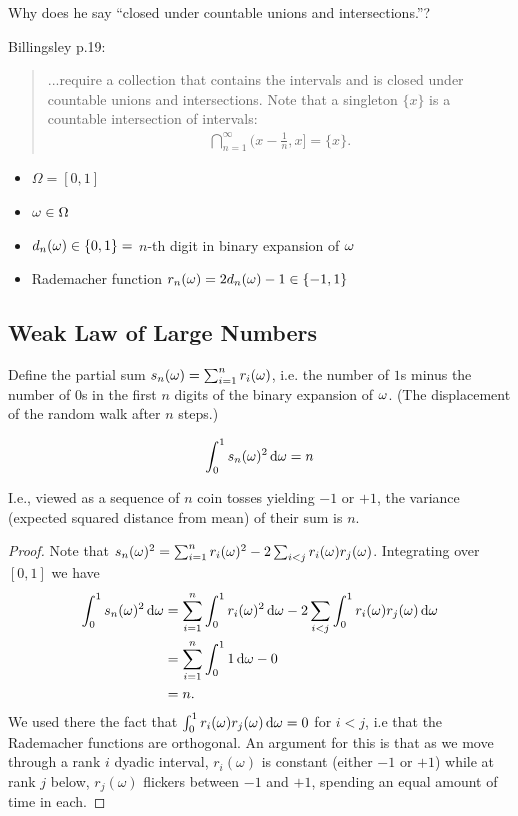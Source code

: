 Why does he say ``closed under countable unions and intersections.​''?

  Billingsley p.19:
  \begin{quote}
    ...require a collection that contains the intervals and is closed under countable unions and intersections.
    Note that a singleton $\{x\}$ is a countable intersection of intervals:
    \begin{align*}
      \bigcap_{n=1}^\infty \Big(x -\frac{1}{n}, x\Big] = \{x\}.
    \end{align*}
  \end{quote}


\begin{itemize}
\item $\Omega = [0, 1]$
\item $\omega \in \Omega$
\item $d_n(\omega) \in \{0, 1\} = $ $n$-th digit in binary expansion of $\omega$
\item Rademacher function $r_n(\omega) = 2d_n(\omega) - 1 \in \{-1, 1\}$
\end{itemize}

\subsection{Weak Law of Large Numbers}

Define the partial sum $s_n(\omega) = \sum_{i=1}^n r_i(\omega)$, i.e. the number of $1$s minus the number of $0$s in
the first $n$ digits of the binary expansion of $\omega$. (The displacement of the random walk after $n$ steps.)

\begin{lemma}
  \begin{align*}
    \int_0^1 s_n(\om)^2 \d\om = n
  \end{align*}
\end{lemma}

I.e., viewed as a sequence of $n$ coin tosses yielding $-1$ or $+1$, the variance (expected squared distance
from mean) of their sum is $n$.

\begin{proof}
  Note that $s_n(\omega)^2 = \sum_{i=1}^n r_i(\omega)^2 - 2\sum_{i<j}r_i(\omega)r_j(\omega)$. Integrating over $[0, 1]$ we have
  \begin{align*}
    \int_0^1 s_n(\om)^2 \d\om
    &= \sum_{i=1}^n \int_0^1 r_i(\om)^2 \d\om - 2\sum_{i<j}\int_0^1r_i(\om)r_j(\om) \d\om \\
    &= \sum_{i=1}^n \int_0^1 1 \d\om - 0 \\
    &= n.
  \end{align*}
  We used there the fact that $\int_0^1r_i(\om)r_j(\om) \d\om = 0$ for $i < j$, i.e that the Rademacher
  functions are orthogonal. An argument for this is that as we move through a rank $i$ dyadic
  interval, $r_i(\omega)$ is constant (either $-1$ or $+1$) while at rank $j$ below, $r_j(\omega)$ flickers
  between $-1$ and $+1$, spending an equal amount of time in each.
\end{proof}


